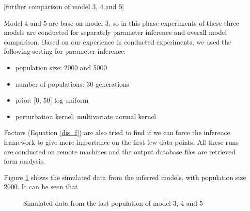 \documentclass[12pt,a4paper]{report}
\begin{document}
[further comparison of model 3, 4 and 5]

Model 4 and 5 are base on model 3, so in this phase experiments of these three models are conducted for separately parameter inference and overall model comparison. Based on our experience in conducted experiments, we used the following setting for parameter inference:

\begin{itemize}
    \item population size: 2000 and 5000
    \item number of populations: 30 generations
    \item prior: [0, 50] log-uniform
    \item perturbation kernel: multivariate normal kernel
\end{itemize}

Factors (Equation \ref{dis_f}) are also tried to find if we can force the inference framework to give more importance on the first few data points. All these runs are conducted on remote machines and the output database files are retrieved form analysis.

Figure \ref{fig:resultCurve345} shows the simulated data from the inferred models, with population size 2000. It can be seen that 

\begin{figure}
    \begin{center}
    \end{center}
    
    \caption{Simulated data from the last population of model 3, 4 and 5}
    \label{fig:resultCurve345}
    
\end{figure}
\end{document}
